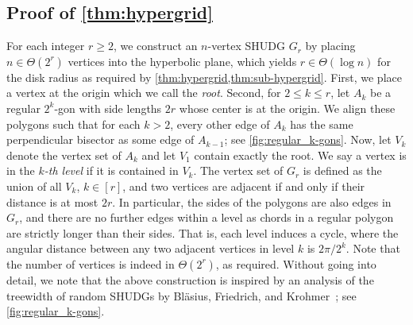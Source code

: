 \documentclass[11pt]{article}
\providecommand{\todo}[2][]{}
\begin{document}
%
%
\subsection{Proof of \texorpdfstring{\cref{thm:hypergrid}}{Theorem 8}}
\label{sec:lower_bound_tw_logn}
\todo{adjust theorem number in texorpdfstring}
%
%
For each integer $ r \geq 2 $, we construct an $n$-vertex SHUDG $G_r$ by placing $ n \in \Theta(2^r) $ vertices into the hyperbolic plane, which yields $ r \in \Theta(\log n) $ for the disk radius as required by \cref{thm:hypergrid,thm:sub-hypergrid}.
First, we place a vertex at the origin which we call the \emph{root}.
Second, for $ 2 \leq k \leq r $, let $ A_k $ be a regular $ 2^k $-gon with side lengths $ 2r $ whose center is at the origin.
We align these polygons such that for each $ k > 2 $, every other edge of $ A_k $ has the same perpendicular bisector as some edge of $ A_{k-1} $; see \cref{fig:regular_k-gons}.
Now, let $ V_k $ denote the vertex set of $ A_k $ and let $ V_1 $ contain exactly the root.
We say a vertex is in the \emph{$k$-th level} if it is contained in $ V_k $.
The vertex set of $ G_r $ is defined as the union of all $ V_k $, $ k \in [r] $, and two vertices are adjacent if and only if their distance is at most $ 2r $.
In particular, the sides of the polygons are also edges in $ G_r $, and there are no further edges within a level as chords in a regular polygon are strictly longer than their sides.
That is, each level induces a cycle, where the angular distance between any two adjacent vertices in level $ k $ is $ 2 \pi / 2^k $.
Note that the number of vertices is indeed in $ \Theta(2^r) $, as required.
%
Without going into detail, we note that the above construction is inspired by an analysis of the treewidth of random SHUDGs by Bläsius, Friedrich, and Krohmer~\cite{blasius_hyperbolic_2016}; see \cref{fig:regular_k-gons}.
\end{document}
